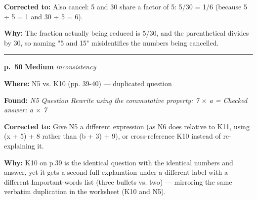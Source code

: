 \documentclass[11pt]{article}
\newcommand{\sevmed}[1]{\textcolor{orange!80!black}{\textbf{#1}}}
\begin{document}
\noindent\textbf{Corrected to: }Also cancel: 5 and 30 share a factor of 5: 5/30 = 1/6 (because 5 $\div$ 5 = 1 and 30 $\div$ 5 = 6).\par
\noindent\textbf{Why: }The fraction actually being reduced is 5/30, and the parenthetical divides by 30, so naming "5 and 15" misidentifies the numbers being cancelled.\par\vspace{4pt}
\noindent\rule{\textwidth}{0.4pt}\par\nobreak\vspace{2pt}
\noindent\textbf{p.~50} \quad \sevmed{Medium} \quad \textit{inconsistency}\par
\noindent\textbf{Where: }N5 vs. K10 (pp. 39-40) --- duplicated question\par
\noindent\textbf{Found: }\textit{N5 Question Rewrite using the commutative property: 7 $\times$ a = Checked answer: a $\times$ 7}\par
\noindent\textbf{Corrected to: }Give N5 a different expression (as N6 does relative to K11, using (x + 5) + 8 rather than (b + 3) + 9), or cross-reference K10 instead of re-explaining it.\par
\noindent\textbf{Why: }K10 on p.39 is the identical question with the identical numbers and answer, yet it gets a second full explanation under a different label with a different Important-words list (three bullets vs. two) --- mirroring the same verbatim duplication in the worksheet (K10 and N5).\par\vspace{4pt}
\end{document}
